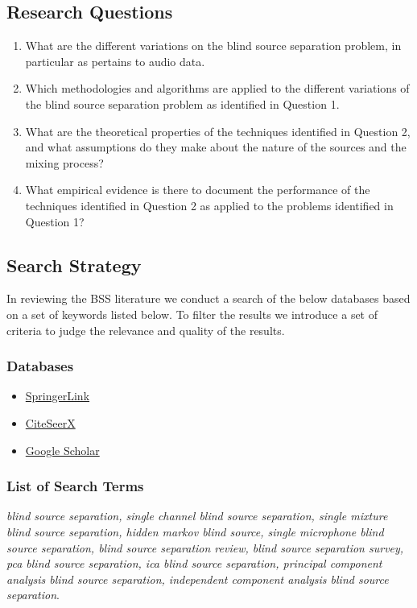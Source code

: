 \documentclass[11pt, oneside, a4paper]{report}
\begin{document}
\subsection{Research Questions}
\begin{enumerate}
  \item What are the different variations on the blind source
    separation problem, in particular as pertains to audio data.
  \item Which methodologies and algorithms are applied to the
    different variations of the blind source separation problem as identified in Question 1.
  \item What are the theoretical properties of the techniques
    identified in Question 2, and  what assumptions do they make about the nature of the sources and the mixing process?
  \item What empirical evidence is there to document the performance
    of the techniques identified in Question 2 as applied to the
    problems identified in Question 1?
\end{enumerate}



\subsection{Search Strategy}
In reviewing the BSS literature we conduct a search of the below databases based on a set of keywords listed below. To filter the results we introduce a set of criteria to judge the relevance and quality of the results.

\subsubsection{Databases}

\begin{itemize}
 \item \href{www.springerlink.com}{SpringerLink}
 \item \href {www.citeseerx}{CiteSeerX}
 \item \href{scholar.google.com}{Google Scholar}
\end{itemize}

\subsubsection{List of Search Terms}

\emph{blind source separation, single channel blind source separation, single mixture blind source separation, hidden markov blind source, single microphone blind source separation, blind source separation review, blind source separation survey, pca blind source separation, ica blind source separation, principal component analysis blind source separation, independent component analysis blind source separation}.
\end{document}
